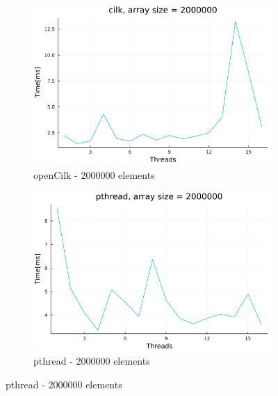 \documentclass[11pt,a4paper,onecolumn,final]{article}
\begin{document}
\begin{figure}
    \begin{subfigure}{.5\textwidth}
        \centering
        \includegraphics[width=.9\linewidth]{../data/image/method/cilk_2000000.png}
        \caption{openCilk - 2000000 elements}
    \end{subfigure}%
    \begin{subfigure}{.5\textwidth}
        \centering
        \includegraphics[width=.9\linewidth]{../data/image/method/pthread_2000000.png}
        \caption{pthread - 2000000 elements}
    \end{subfigure}
\end{figure}
\end{document}
